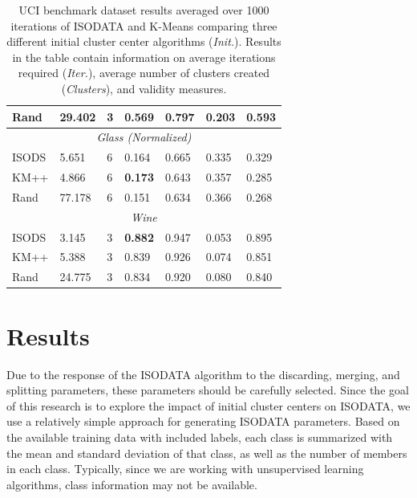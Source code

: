 \documentclass[a4paper,10pt]{article}
\begin{document}
\begin{table}[ht]
\begin{tabular}{ |p{1.25cm}||p{1.25cm} p{1.25cm} p{1.25cm} p{1.25cm} p{1.25cm} p{1.25cm}|}
            Rand  & 29.402 & 3        & 0.569           & 0.797 & 0.203 & 0.593  \\
            \hline
            \multicolumn{7}{|c|}{\textit{Glass (Normalized)}}                    \\[1ex]
            ISODS & 5.651  & 6        & 0.164           & 0.665 & 0.335 & 0.329  \\
            KM++  & 4.866  & 6        & \textbf{0.173}  & 0.643 & 0.357 & 0.285  \\
            Rand  & 77.178 & 6        & 0.151           & 0.634 & 0.366 & 0.268  \\
            \hline
            \multicolumn{7}{|c|}{\textit{Wine}}                                  \\[1ex]
            ISODS & 3.145  & 3        & \textbf{0.882}  & 0.947 & 0.053 & 0.895  \\
            KM++  & 5.388  & 3        & 0.839           & 0.926 & 0.074 & 0.851  \\
            Rand  & 24.775 & 3        & 0.834           & 0.920 & 0.080 & 0.840  \\
            \hline
      \end{tabular}
      \caption{UCI benchmark dataset results averaged over 1000 iterations of
            ISODATA and K-Means comparing three different initial cluster center
            algorithms (\textit{Init.}). Results in the table contain
            information on average iterations required (\textit{Iter.}), average
            number of clusters created (\textit{Clusters}), and validity
            measures.}
      \label{tab:ucitable}
\end{table}

\section{Results}

Due to the response of the ISODATA algorithm to the discarding, merging, and
splitting parameters, these parameters should be carefully selected. Since the
goal of this research is to explore the impact of initial cluster centers on
ISODATA, we use a relatively simple approach for generating ISODATA parameters.
Based on the available training data with included labels, each class is
summarized with the mean and standard deviation of that class, as well as the
number of members in each class. Typically, since we are working with
unsupervised learning algorithms, class information may not be available.
\end{document}
